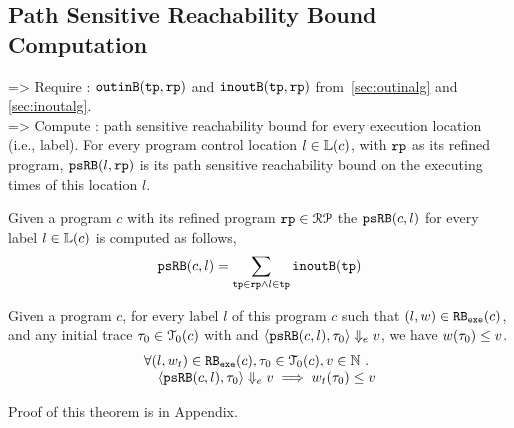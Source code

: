 \subsection{Path Sensitive Reachability Bound Computation}
=> Require : ${\mathtt{outinB}}({\mathtt{tp}}, {\mathtt{rp}})$ and ${\mathtt{inoutB}}({\mathtt{tp}}, {\mathtt{rp}})$ from~\ref{sec:outinalg} and \ref{sec:inoutalg}.
\\
=> Compute : path sensitive reachability bound for every execution location (i.e., label).
For every program control location $l \in \mathbb{L}(c)$, with ${\mathtt{rp}}$ as its refined program,
 ${\mathtt{psRB}}(l, {\mathtt{rp}})$ is its path sensitive reachability bound on the executing times of this location $l$.
 \\
 \begin{defn}
  \label{def:label_psrb}
Given a program $c$ with its refined program ${\mathtt{rp}} \in \mathcal{RP}$
the ${\mathtt{psRB}}(c, l)$ for every label $l \in \mathbb{L}(c)$ is computed as follows,
\\
\[ {\mathtt{psRB}}(c, l) = \sum\limits_{{\mathtt{tp}} \in {\mathtt{rp}} \land 
l \in {\mathtt{tp}}} {\mathtt{inoutB}}({\mathtt{tp}})\]
 \end{defn}
\begin{thm}
  \label{thm:pathsensitive_rb_soundness}
Given a program ${c}$, for every label $l$ of this program $c$ such that $(l, w) \in {\mathtt{RB_{exe}}}(c)$, 
and any initial trace ${\mathtt{\tau}}_0 \in \mathcal{T}_0(c)$ with 
and $\langle {\mathtt{psRB}}(c, l), {\mathtt{\tau}}_0 \rangle \Downarrow_e v$,
we have $ w({\mathtt{\tau}}_0) \leq v $.
%
\[
  \begin{array}{l}
  \forall (l, w_{t}) \in {\mathtt{RB_{exe}}}(c),
  {\mathtt{\tau}}_0 \in \mathcal{T}_0(c), 
  v \in \mathbb{N} ~.~
  \\ \quad
  \langle {\mathtt{psRB}}(c, l), {\mathtt{\tau}}_0 \rangle \Downarrow_e v
  \implies
  w_{t}({\mathtt{\tau}}_0) \leq v
  \end{array}
  \]
\end{thm}
%
Proof of this theorem is in Appendix.